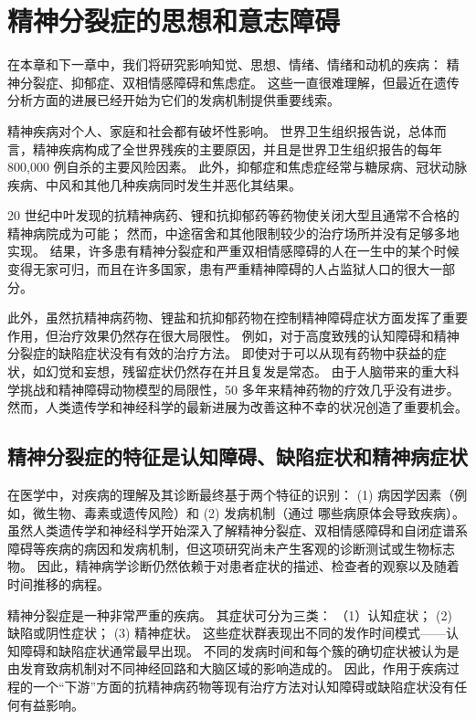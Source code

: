 \chapter{精神分裂症的思想和意志障碍} \label{chap:chap60}

在本章和下一章中，我们将研究影响知觉、思想、情绪、情绪和动机的疾病：
精神分裂症、抑郁症、双相情感障碍和焦虑症。
这些一直很难理解，但最近在遗传分析方面的进展已经开始为它们的发病机制提供重要线索。


精神疾病对个人、家庭和社会都有破坏性影响。
世界卫生组织报告说，总体而言，精神疾病构成了全世界残疾的主要原因，并且是世界卫生组织报告的每年 800,000 例自杀的主要风险因素。
此外，抑郁症和焦虑症经常与糖尿病、冠状动脉疾病、中风和其他几种疾病同时发生并恶化其结果。


20 世纪中叶发现的抗精神病药、锂和抗抑郁药等药物使关闭大型且通常不合格的精神病院成为可能；
然而，中途宿舍和其他限制较少的治疗场所并没有足够多地实现。
结果，许多患有精神分裂症和严重双相情感障碍的人在一生中的某个时候变得无家可归，而且在许多国家，患有严重精神障碍的人占监狱人口的很大一部分。


此外，虽然抗精神病药物、锂盐和抗抑郁药物在控制精神障碍症状方面发挥了重要作用，但治疗效果仍然存在很大局限性。
例如，对于高度致残的认知障碍和精神分裂症的缺陷症状没有有效的治疗方法。
即使对于可以从现有药物中获益的症状，如幻觉和妄想，残留症状仍然存在并且复发是常态。
由于人脑带来的重大科学挑战和精神障碍动物模型的局限性，50 多年来精神药物的疗效几乎没有进步。
然而，人类遗传学和神经科学的最新进展为改善这种不幸的状况创造了重要机会。



\section{精神分裂症的特征是认知障碍、缺陷症状和精神病症状}

在医学中，对疾病的理解及其诊断最终基于两个特征的识别：
(1) 病因学因素（例如，微生物、毒素或遗传风险）和 
(2) 发病机制（通过 哪些病原体会导致疾病）。
虽然人类遗传学和神经科学开始深入了解精神分裂症、双相情感障碍和自闭症谱系障碍等疾病的病因和发病机制，但这项研究尚未产生客观的诊断测试或生物标志物。
因此，精神病学诊断仍然依赖于对患者症状的描述、检查者的观察以及随着时间推移的病程。


精神分裂症是一种非常严重的疾病。
其症状可分为三类：
（1）认知症状； 
(2) 缺陷或阴性症状； 
(3) 精神症状。
这些症状群表现出不同的发作时间模式——认知障碍和缺陷症状通常最早出现。
不同的发病时间和每个簇的确切症状被认为是由发育致病机制对不同神经回路和大脑区域的影响造成的。
因此，作用于疾病过程的一个“下游”方面的抗精神病药物等现有治疗方法对认知障碍或缺陷症状没有任何有益影响。


